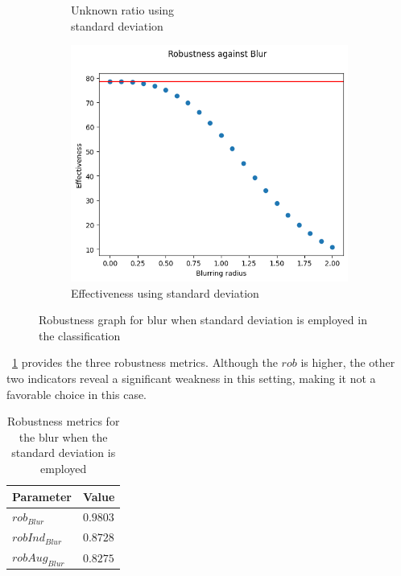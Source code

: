 \begin{figure}[h]
\begin{subfigure}{.33\textwidth}
		\caption{Unknown ratio using \\ standard deviation}
		\label{fig:bl_vu_unkn}
	\end{subfigure}%
	\begin{subfigure}{.33\textwidth}
		\centering
		\includegraphics[width=0.9\linewidth]{ImageFiles/EvalBNN/BL/VU/eff}
		\caption{Effectiveness using standard deviation}
		\label{fig:bl_vu_eff}
	\end{subfigure}
	\caption{Robustness graph for blur when standard deviation is employed in the classification}
	\label{fig:bl_vu}
\end{figure}

\Tab~\ref{table:rob_bl_vu} provides the three robustness metrics. Although the $rob$ is higher, the other two indicators reveal a significant weakness in this setting, making it not a favorable choice in this case.

\begin{table}[h]
	\centering
	\begin{tabular}{|| l | l ||} 
		\hline
		\textbf{Parameter} & \textbf{Value} \\
		\hline
		\hline
		$rob_{Blur}$ & $0.9803$ \\
		$robInd_{Blur}$ & $0.8728$ \\
		$robAug_{Blur}$ & $0.8275$ \\	
		\hline
	\end{tabular}	
	\caption{Robustness metrics for the blur when the standard deviation is employed}
	\label{table:rob_bl_vu}
\end{table}

